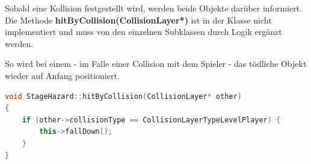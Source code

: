 Sobald eine Kollision festgestellt wird, werden beide Objekte darüber informiert. Die Methode \textbf{hitByCollision(CollisionLayer*)} ist in der  Klasse nicht implementiert und muss von den einzelnen Subklassen durch Logik ergänzt werden.

So wird bei einem  - im Falle einer Collision mit dem Spieler - das tödliche Objekt wieder auf Anfang positioniert.

\begin{lstlisting}[label=lst:hit_by_collision,
				   language=C++,
				   firstnumber=32,
				   caption=Collision Notification ( StageHazard.cpp )]
void StageHazard::hitByCollision(CollisionLayer* other)
{
	if (other->collisionType == CollisionLayerTypeLevelPlayer) {
		this->fallDown();
	}
}
\end{lstlisting}
